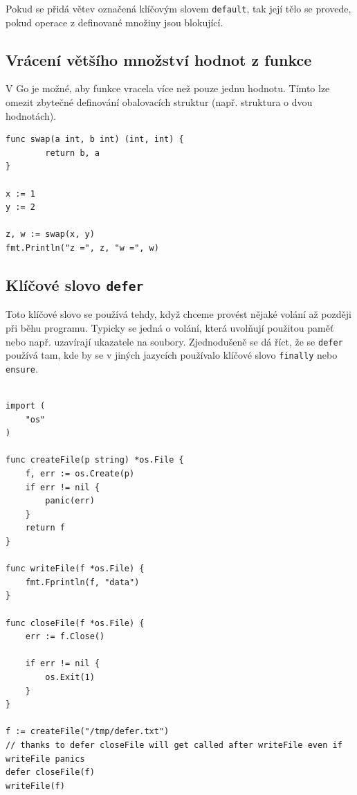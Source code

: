 \documentclass[12pt, a4paper]{article}
\begin{document}
Pokud se přidá větev označená klíčovým slovem \texttt{default}, tak její tělo se provede, pokud operace z definované množiny jsou blokující.

\subsection{Vrácení většího množství hodnot z funkce}

V Go je možné, aby funkce vracela více než pouze jednu hodnotu. Tímto lze omezit zbytečné definování obalovacích struktur (např. struktura o dvou hodnotách).


\begin{lstlisting}[caption={Funkce vracející dvě hodnoty}, captionpos=b, language=Golang]
func swap(a int, b int) (int, int) {
        return b, a
}
 
x := 1
y := 2

z, w := swap(x, y)
fmt.Println("z =", z, "w =", w)
\end{lstlisting}

\subsection{Klíčové slovo \texttt{defer}}

Toto klíčové slovo se používá tehdy, když chceme provést nějaké volání až později při běhu programu. Typicky se jedná o volání, která uvolňují použitou paměť nebo např. uzavírají ukazatele na soubory. Zjednodušeně se dá říct, že se \texttt{defer} používá tam, kde by se v jiných jazycích používalo klíčové slovo \texttt{finally} nebo \texttt{ensure}.



\begin{lstlisting}[caption={Klíčové slovo \texttt{defer}}, captionpos=b, language=Golang]

import (
    "os"
)

func createFile(p string) *os.File {
    f, err := os.Create(p)
    if err != nil {
        panic(err)
    }
    return f
}

func writeFile(f *os.File) {
    fmt.Fprintln(f, "data")
}

func closeFile(f *os.File) {
    err := f.Close()

    if err != nil {
        os.Exit(1)
    }
}

f := createFile("/tmp/defer.txt")
// thanks to defer closeFile will get called after writeFile even if writeFile panics
defer closeFile(f)
writeFile(f)
\end{lstlisting}
\end{document}
